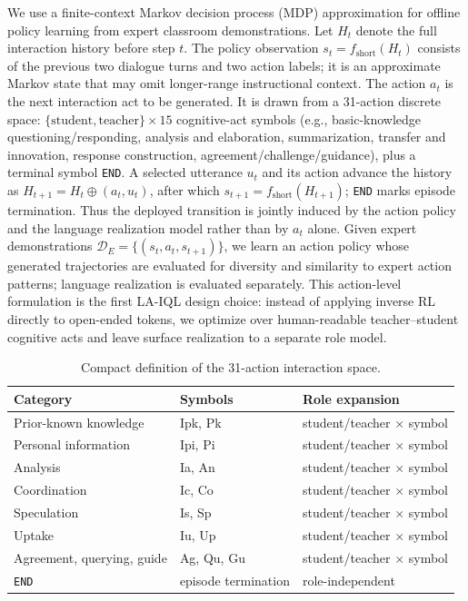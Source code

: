 \documentclass[manuscript,review,anonymous]{acmart}
\begin{document}
We use a finite-context Markov decision process (MDP) approximation for offline policy learning from expert classroom demonstrations. Let $H_t$ denote the full interaction history before step $t$.
The policy observation $s_t=f_{\mathrm{short}}(H_t)$ consists of the previous two dialogue turns and two action labels; it is an approximate Markov state that may omit longer-range instructional context.
The action $a_t$ is the next interaction act to be generated.
It is drawn from a 31-action discrete space:
$\{\text{student}, \text{teacher}\} \times 15$ cognitive-act symbols
(e.g., basic-knowledge questioning/responding, analysis and elaboration, summarization, transfer and innovation, response construction, agreement/challenge/guidance),
plus a terminal symbol \texttt{END}.
A selected utterance $u_t$ and its action advance the history as $H_{t+1}=H_t\oplus(a_t,u_t)$, after which $s_{t+1}=f_{\mathrm{short}}(H_{t+1})$; \texttt{END} marks episode termination. Thus the deployed transition is jointly induced by the action policy and the language realization model rather than by $a_t$ alone.
Given expert demonstrations $\mathcal{D}_E=\{(s_t,a_t,s_{t+1})\}$, we learn an action policy whose generated trajectories are evaluated for diversity and similarity to expert action patterns; language realization is evaluated separately.
This action-level formulation is the first LA-IQL design choice: instead of applying inverse RL directly to open-ended tokens, we optimize over human-readable teacher--student cognitive acts and leave surface realization to a separate role model.

\begin{table}[t]
\centering
\small
\begin{tabularx}{\columnwidth}{@{}>{\raggedright\arraybackslash}X>{\raggedright\arraybackslash}X>{\raggedright\arraybackslash}X@{}}
\toprule
Category & Symbols & Role expansion \\
\midrule
Prior-known knowledge & Ipk, Pk & student/teacher $\times$ symbol \\
Personal information & Ipi, Pi & student/teacher $\times$ symbol \\
Analysis & Ia, An & student/teacher $\times$ symbol \\
Coordination & Ic, Co & student/teacher $\times$ symbol \\
Speculation & Is, Sp & student/teacher $\times$ symbol \\
Uptake & Iu, Up & student/teacher $\times$ symbol \\
Agreement, querying, guide & Ag, Qu, Gu & student/teacher $\times$ symbol \\
\texttt{END} & episode termination & role-independent \\
\bottomrule
\end{tabularx}
\caption{Compact definition of the 31-action interaction space.}
\label{tab:action-space}
\end{table}
\end{document}

